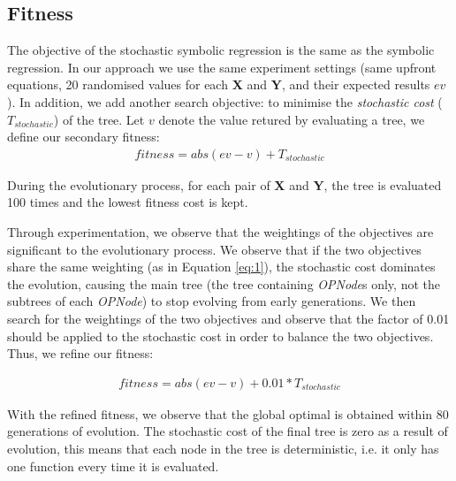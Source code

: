 \subsection{Fitness}
The objective of the stochastic symbolic regression is the same as the symbolic regression. In our approach we use the same experiment settings (same upfront equations, 20 randomised values for each \textbf{X} and \textbf{Y}, and their expected results $ev$). In addition, we add another search objective: to minimise the \emph{stochastic cost} ($T_{stochastic}$) of the tree. Let $v$ denote the value retured by evaluating a tree, we define our secondary fitness:
\begin{align}
fitness = abs(ev - v) + T_{stochastic} \label{eq:1}
\end{align}

During the evolutionary process, for each pair of \textbf{X} and \textbf{Y}, the tree is evaluated 100 times and the lowest fitness cost is kept.

Through experimentation, we observe that the weightings of the objectives are significant to the evolutionary process. We observe that if the two objectives share the same weighting (as in Equation \ref{eq:1}), the stochastic cost dominates the evolution, causing the main tree (the tree containing \emph{OPNode}s only, not the subtrees of each \emph{OPNode}) to stop evolving from early generations. We then search for the weightings of the two objectives and observe that the factor of 0.01 should be applied to the stochastic cost in order to balance the two objectives. Thus, we refine our fitness:

\begin{align}
fitness = abs(ev - v) + 0.01*T_{stochastic} \label{eq:2}
\end{align}

With the refined fitness, we observe that the global optimal is obtained within 80 generations of evolution. The stochastic cost of the final tree is zero as a result of evolution, this means that each node in the tree is deterministic, i.e. it only has one function every time it is evaluated. 

